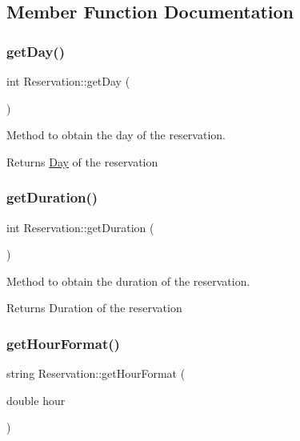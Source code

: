 \subsection{Member Function Documentation}
\mbox{\label{class_reservation_a22d66f6cc7532b775d5a05338ad6b196}} 
\subsubsection{\texorpdfstring{get\+Day()}{getDay()}}
{\footnotesize\ttfamily int Reservation\+::get\+Day (\begin{DoxyParamCaption}{ }\end{DoxyParamCaption})}



Method to obtain the day of the reservation. 

\begin{DoxyReturn}{Returns}
\mbox{\hyperlink{class_day}{Day}} of the reservation 
\end{DoxyReturn}
\mbox{\label{class_reservation_a9d91ef1230af46952cb5422ae769bfa1}} 
\subsubsection{\texorpdfstring{get\+Duration()}{getDuration()}}
{\footnotesize\ttfamily int Reservation\+::get\+Duration (\begin{DoxyParamCaption}{ }\end{DoxyParamCaption})}



Method to obtain the duration of the reservation. 

\begin{DoxyReturn}{Returns}
Duration of the reservation 
\end{DoxyReturn}
\mbox{\label{class_reservation_a36aa0b30371103b07aa331b33e6109d1}} 
\subsubsection{\texorpdfstring{get\+Hour\+Format()}{getHourFormat()}}
{\footnotesize\ttfamily string Reservation\+::get\+Hour\+Format (\begin{DoxyParamCaption}\item[{double}]{hour }\end{DoxyParamCaption})}



